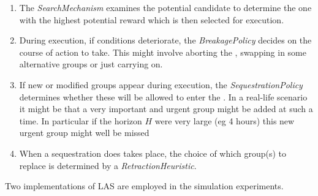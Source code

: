 \begin{enumerate}
\item The \emph{SearchMechanism} examines the potential candidate \echelons to determine the one with the highest potential reward which is then selected for execution.

\item During execution, if conditions deteriorate, the \emph{BreakagePolicy} decides on the course of action to take. This might involve aborting the \echelon, swapping in some alternative groups or just carrying on.

\item If new or modified groups appear during execution, the \emph{SequestrationPolicy} determines whether these will be allowed to enter the \echelon. In a real-life scenario it might be that a very important and urgent group might be added at such a time. In particular if the horizon $H$ were very large (eg 4 hours) this new urgent group might well be missed

\item When a sequestration does takes place, the choice of which group(s) to replace is determined by a \emph{RetractionHeuristic}.

\end{enumerate}

Two implementations of LAS are employed in the simulation experiments.

